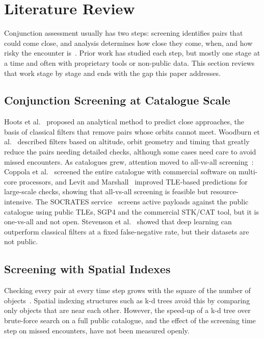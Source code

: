 \documentclass[runningheads]{llncs}
\begin{document}
\section{Literature Review}
\label{sec:lit}

Conjunction assessment usually has two steps: screening identifies pairs that could come close, and analysis determines how close they come, when, and how risky the encounter is~\cite{b7}. Prior work has studied each step, but mostly one stage at a time and often with proprietary tools or non-public data. This section reviews that work stage by stage and ends with the gap this paper addresses.

\subsection{Conjunction Screening at Catalogue Scale}
Hoots et al.~\cite{b12} proposed an analytical method to predict close approaches, the basis of classical filters that remove pairs whose orbits cannot meet. Woodburn et al.~\cite{b14} described filters based on altitude, orbit geometry and timing that greatly reduce the pairs needing detailed checks, although some cases need care to avoid missed encounters. As catalogues grew, attention moved to all-vs-all screening~\cite{b9,b15}: Coppola et al.~\cite{b17} screened the entire catalogue with commercial software on multi-core processors, and Levit and Marshall~\cite{b18} improved TLE-based predictions for large-scale checks, showing that all-vs-all screening is feasible but resource-intensive. The SOCRATES service~\cite{b19} screens active payloads against the public catalogue using public TLEs, SGP4 and the commercial STK/CAT tool, but it is one-vs-all and not open. Stevenson et al.~\cite{b20} showed that deep learning can outperform classical filters at a fixed false-negative rate, but their datasets are not public.

\subsection{Screening with Spatial Indexes}
Checking every pair at every time step grows with the square of the number of objects~\cite{b9}. Spatial indexing structures such as k-d trees avoid this by comparing only objects that are near each other. However, the speed-up of a k-d tree over brute-force search on a full public catalogue, and the effect of the screening time step on missed encounters, have not been measured openly.
\end{document}

